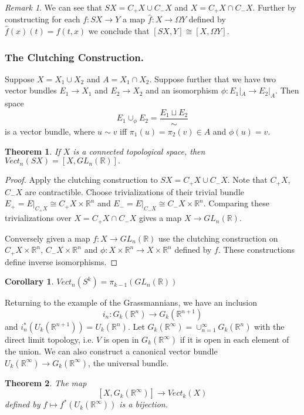\documentclass[a4paper,10pt]{article}
\theoremstyle{plain}%
\newtheorem{thm}{Theorem}
\newtheorem{cor}{Corollary}
\theoremstyle{definition}
\theoremstyle{remark}
\newtheorem{rem}{Remark}
\newcommand{\RR}{\mathbb{R}}
\begin{document}
\begin{rem}We can see that $SX = C_+X\cup C_- X$ and $X = C_+X\cap C_- X$. Further by constructing for each $f: SX\to Y$ a map $\hat{f}:X\to \Omega Y$ defined by $\hat{f}(x)(t)= f(t,x)$ we conclude that $[SX,Y]\cong [X,\Omega Y]$.
\end{rem}

\subsubsection{The Clutching Construction.}

Suppose $X = X_1 \cup X_2$ and $A= X_1 \cap X_2$. Suppose further that we have two vector bundles $E_1\to X_1$ and $E_2\to X_2$ and an isomorphism $\phi: E_1|_A \to E_2|_A.$
Then space 
\[
E_1\cup_\phi E_2 = \frac{E_1\sqcup E_2}{\sim}
\] 
is a vector bundle, where $u\sim v$ iff $\pi_1(u) = \pi_2(v)\in A$ and $\phi(u)=v$.

\begin{thm}
If $X$ is a connected topological space, then $Vect_n(SX) = [X, GL_n(\RR)].$
\end{thm}

\begin{proof} Apply the clutching construction to $SX = C_+X\cup C_- X$. Note that $C_+ X$, $C_-X$ are contractible. Choose trivializations of their trivial bundle $E_+ = E |_{C_+X}\cong C_+X\times \RR^n$ and $E_- = E |_{C_-X}\cong C_-X\times \RR^n.$ Comparing these trivializations over $X = C_+X\cap C_- X$ gives a map $X\to GL_n(\RR).$

Conversely given a map $f:X\to GL_n(\RR)$ use the clutching construction on $C_+X\times \RR^n$, $C_-X\times \RR^n$ and $\phi:X\times \RR^n\to X\times\RR^n$ defined by $f$. These constructions define inverse isomorphisms.\end{proof}

\begin{cor}
$Vect_n(S^ k) =  \pi_{k-1}(GL_n(\RR))$
\end{cor}

Returning to the example of the Grassmannians, we have an inclusion
\[ 
i_n:G_k(\RR^n)\to G_k(\RR^{n+1})
\]
and $i_n^*(U_k(\RR^{n+1}))= U_k(\RR^n).$ Let $G_k(\RR^\infty) = \cup_{n=1}^\infty G_k(\RR^n)$ with the direct limit topology, i.e. $V$ is open in $G_k(\RR^\infty)$ if it is open in each element of the union. We can also construct a canonical vector bundle $U_k(\RR^\infty)\to G_k(\RR^\infty)$, the universal bundle.

\begin{thm}
The map
\[
[X,G_k(\RR^\infty)]\to Vect_k(X)
\] defined by $f\mapsto f^*(U_k(\RR^\infty))$ is a bijection.
\end{thm}
\end{document}
